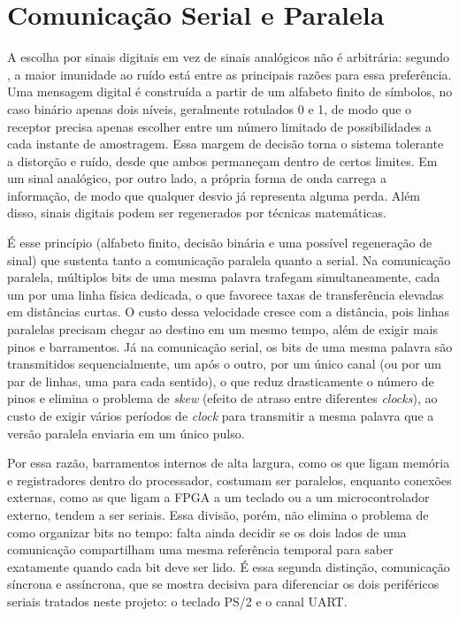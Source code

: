 \documentclass[
	12pt,
	oneside,
	a4paper,
	english,
	french,
	spanish,
	brazil,
	]{abntex2}
\begin{document}
\section{Comunicação Serial e Paralela}
\label{sec:comunicacao_serial_paralela}
A escolha por sinais digitais em vez de sinais analógicos não é arbitrária: segundo , a maior imunidade ao ruído está entre as principais razões para essa preferência. Uma mensagem digital é construída a partir de um alfabeto finito de símbolos, no caso binário apenas dois níveis, geralmente rotulados 0 e 1, de modo que o receptor precisa apenas escolher entre um número limitado de possibilidades a cada instante de amostragem. Essa margem de decisão torna o sistema tolerante a distorção e ruído, desde que ambos permaneçam dentro de certos limites. Em um sinal analógico, por outro lado, a própria forma de onda carrega a informação, de modo que qualquer desvio já representa alguma perda. Além disso, sinais digitais podem ser regenerados por técnicas matemáticas.

É esse princípio (alfabeto finito, decisão binária e uma possível regeneração de sinal) que sustenta tanto a comunicação paralela quanto a serial. Na comunicação paralela, múltiplos bits de uma mesma palavra trafegam simultaneamente, cada um por uma linha física dedicada, o que favorece taxas de transferência elevadas em distâncias curtas. O custo dessa velocidade cresce com a distância, pois linhas paralelas precisam chegar ao destino em um mesmo tempo, além de exigir mais pinos e barramentos. Já na comunicação serial, os bits de uma mesma palavra são transmitidos sequencialmente, um após o outro, por um único canal (ou por um par de linhas, uma para cada sentido), o que reduz drasticamente o número de pinos e elimina o problema de \emph{skew} (efeito de atraso entre diferentes \emph{clocks}), ao custo de exigir vários períodos de \emph{clock} para transmitir a mesma palavra que a versão paralela enviaria em um único pulso.

Por essa razão, barramentos internos de alta largura, como os que ligam memória e registradores dentro do processador, costumam ser paralelos, enquanto conexões externas, como as que ligam a FPGA a um teclado ou a um microcontrolador externo, tendem a ser seriais. Essa divisão, porém, não elimina o problema de como organizar bits no tempo: falta ainda decidir se os dois lados de uma comunicação compartilham uma mesma referência temporal para saber exatamente quando cada bit deve ser lido. É essa segunda distinção, comunicação síncrona e assíncrona, que se mostra decisiva para diferenciar os dois periféricos seriais tratados neste projeto: o teclado PS/2 e o canal UART.
\end{document}
